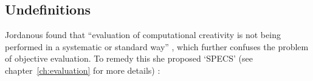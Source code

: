 




%



\subsection{Undefinitions}

Jordanous found that ``evaluation of computational creativity is not being performed in a systematic or standard way'' \autocite*{Jordanous2011}, which further confuses the problem of objective evaluation. To remedy this she proposed `\acf{SPECS}' (see chapter~\ref{ch:evaluation} for more details) \autocite*{Jordanous2012a}:

